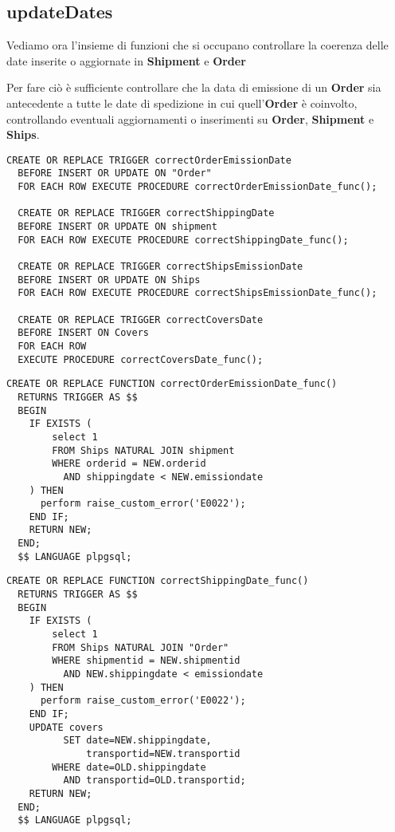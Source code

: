 \subsection{\textbf{updateDates}}

Vediamo ora l'insieme di funzioni che si occupano controllare la coerenza delle date inserite o aggiornate in \textbf{Shipment} e \textbf{Order}

Per fare ciò è sufficiente controllare che la data di emissione di un \textbf{Order} sia antecedente a tutte le date di spedizione in cui quell'\textbf{Order} è coinvolto, controllando eventuali aggiornamenti o inserimenti su \textbf{Order}, \textbf{Shipment} e \textbf{Ships}.

\begin{lstlisting}[caption={Trigger per implementare \textbf{updateDates}}]
  CREATE OR REPLACE TRIGGER correctOrderEmissionDate
  BEFORE INSERT OR UPDATE ON "Order"
  FOR EACH ROW EXECUTE PROCEDURE correctOrderEmissionDate_func();

  CREATE OR REPLACE TRIGGER correctShippingDate
  BEFORE INSERT OR UPDATE ON shipment
  FOR EACH ROW EXECUTE PROCEDURE correctShippingDate_func();

  CREATE OR REPLACE TRIGGER correctShipsEmissionDate
  BEFORE INSERT OR UPDATE ON Ships
  FOR EACH ROW EXECUTE PROCEDURE correctShipsEmissionDate_func();

  CREATE OR REPLACE TRIGGER correctCoversDate
  BEFORE INSERT ON Covers
  FOR EACH ROW 
  EXECUTE PROCEDURE correctCoversDate_func();

\end{lstlisting}

\begin{lstlisting}[caption={Funzione \textbf{correctOrderEmissionDate}}]
  CREATE OR REPLACE FUNCTION correctOrderEmissionDate_func()
  RETURNS TRIGGER AS $$
  BEGIN
    IF EXISTS (
        select 1 
        FROM Ships NATURAL JOIN shipment
        WHERE orderid = NEW.orderid
          AND shippingdate < NEW.emissiondate
    ) THEN 
      perform raise_custom_error('E0022');
    END IF;
    RETURN NEW;
  END;
  $$ LANGUAGE plpgsql;
\end{lstlisting}

\begin{lstlisting}[caption={Funzione \textbf{correctShippingDate}}]
  CREATE OR REPLACE FUNCTION correctShippingDate_func()
  RETURNS TRIGGER AS $$
  BEGIN
    IF EXISTS (
        select 1 
        FROM Ships NATURAL JOIN "Order"
        WHERE shipmentid = NEW.shipmentid
          AND NEW.shippingdate < emissiondate
    ) THEN
      perform raise_custom_error('E0022');
    END IF;
    UPDATE covers 
          SET date=NEW.shippingdate, 
              transportid=NEW.transportid 
        WHERE date=OLD.shippingdate 
          AND transportid=OLD.transportid;
    RETURN NEW;
  END;
  $$ LANGUAGE plpgsql;
\end{lstlisting}

